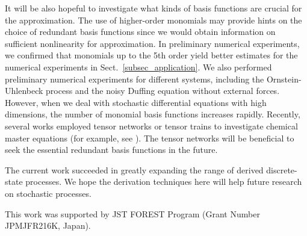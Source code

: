 \documentclass[sn-mathphys,Numbered]{sn-jnl}%
\theoremstyle{thmstyleone}%
\theoremstyle{thmstyletwo}%
\theoremstyle{thmstylethree}%
\begin{document}
It will be also hopeful to investigate what kinds of basis functions are crucial for the approximation. The use of higher-order monomials may provide hints on the choice of redundant basis functions since we would obtain information on sufficient nonlinearity for approximation. In preliminary numerical experiments, we confirmed that monomials up to the 5th order yield better estimates for the numerical experiments in Sect.~\ref{subsec_application}. We also performed preliminary numerical experiments for different systems, including the Ornstein-Uhlenbeck process and the noisy Duffing equation without external forces. However, when we deal with stochastic differential equations with high dimensions, the number of monomial basis functions increases rapidly. Recently, several works employed tensor networks or tensor trains to investigate chemical master equations (for example, see \cite{Gelss_thesis, Ion2021, Nicholson2023}). The tensor networks will be beneficial to seek the essential redundant basis functions in the future.

The current work succeeded in greatly expanding the range of derived discrete-state processes. We hope the derivation techniques here will help future research on stochastic processes.




\backmatter



This work was supported by JST FOREST Program (Grant Number JPMJFR216K, Japan). 



\end{document}
